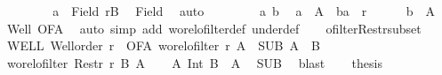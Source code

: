 \begin{isabellebody}
\ \ \ \ \isamarkupfalse%
\ {\isacharasterisk}{\kern0pt}\ \isamarkupfalse%
\ {\isachardoublequoteopen}a\ {\isasymin}\ Field\ {\isacharquery}{\kern0pt}rB{\isachardoublequoteclose}\ \isamarkupfalse%
\ Field\ \isamarkupfalse%
\ auto\isanewline
\ \ \isamarkupfalse%
\isanewline
\ \ \ \ \isamarkupfalse%
\ a\ b\ \isamarkupfalse%
\ {\isachardoublequoteopen}a\ {\isasymin}\ A{\isachardoublequoteclose}\ \ {\isachardoublequoteopen}{\isacharparenleft}{\kern0pt}b{\isacharcomma}{\kern0pt}a{\isacharparenright}{\kern0pt}\ {\isasymin}\ r{\isachardoublequoteclose}\isanewline
\ \ \ \ \isamarkupfalse%
\ {\isachardoublequoteopen}b\ {\isasymin}\ A{\isachardoublequoteclose}\ \isamarkupfalse%
\ Well\ OFA\ \isamarkupfalse%
\ {\isacharparenleft}{\kern0pt}auto\ simp\ add{\isacharcolon}{\kern0pt}\ wo{\isacharunderscore}{\kern0pt}rel{\isachardot}{\kern0pt}ofilter{\isacharunderscore}{\kern0pt}def\ under{\isacharunderscore}{\kern0pt}def{\isacharparenright}{\kern0pt}\isanewline
\ \ \isamarkupfalse%
\isanewline
{}\isamarkupfalse%
%
\endisatagproof
{\isafoldproof}%
%
\isadelimproof
\isanewline
%
\endisadelimproof
\isanewline
{}\isamarkupfalse%
\ ofilter{\isacharunderscore}{\kern0pt}Restr{\isacharunderscore}{\kern0pt}subset{\isacharcolon}{\kern0pt}\isanewline
{}\ WELL{\isacharcolon}{\kern0pt}\ {\isachardoublequoteopen}Well{\isacharunderscore}{\kern0pt}order\ r{\isachardoublequoteclose}\ \ OFA{\isacharcolon}{\kern0pt}\ {\isachardoublequoteopen}wo{\isacharunderscore}{\kern0pt}rel{\isachardot}{\kern0pt}ofilter\ r\ A{\isachardoublequoteclose}\ \ SUB{\isacharcolon}{\kern0pt}\ {\isachardoublequoteopen}A\ {\isasymle}\ B{\isachardoublequoteclose}\isanewline
{}\ {\isachardoublequoteopen}wo{\isacharunderscore}{\kern0pt}rel{\isachardot}{\kern0pt}ofilter\ {\isacharparenleft}{\kern0pt}Restr\ r\ B{\isacharparenright}{\kern0pt}\ A{\isachardoublequoteclose}\isanewline
%
\isadelimproof
%
\endisadelimproof
%
\isatagproof
{}\isamarkupfalse%
{\isacharminus}{\kern0pt}\isanewline
\ \ \isamarkupfalse%
\ {\isachardoublequoteopen}A\ Int\ B\ {\isacharequal}{\kern0pt}\ A{\isachardoublequoteclose}\ \isamarkupfalse%
\ SUB\ \isamarkupfalse%
\ blast\isanewline
\ \ \isamarkupfalse%
\ {\isacharquery}{\kern0pt}thesis\ \isamarkupfalse%

\end{isabellebody}
